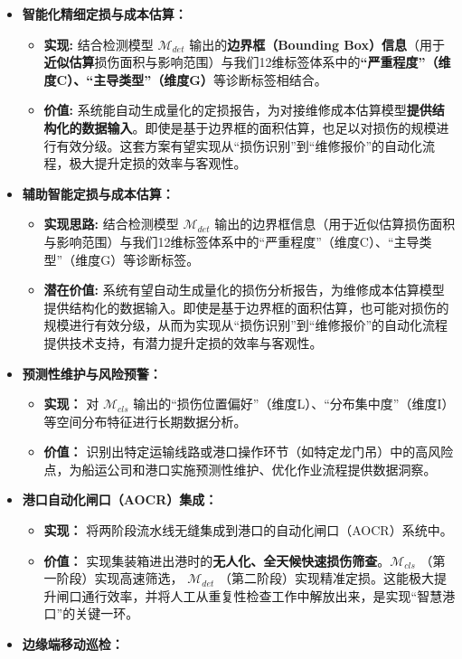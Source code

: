 \documentclass[
]{article}
\begin{document}
\begin{itemize}
\item
  \textbf{智能化精细定损与成本估算：}

  \begin{itemize}
  \item
    \textbf{实现:} 结合检测模型 \(\mathcal{M}_{det}\)
    输出的\textbf{边界框（Bounding
    Box）信息}（用于\textbf{近似估算}损伤面积与影响范围）与我们12维标签体系中的\textbf{``严重程度''（维度C）、``主导类型''（维度G）}等诊断标签相结合。
  \item
    \textbf{价值:}
    系统能自动生成量化的定损报告，为对接维修成本估算模型\textbf{提供结构化的数据输入}。即使是基于边界框的面积估算，也足以对损伤的规模进行有效分级。这套方案有望实现从``损伤识别''到``维修报价''的自动化流程，极大提升定损的效率与客观性。
  \end{itemize}
\item
  \textbf{辅助智能定损与成本估算：}

  \begin{itemize}
  \item
    \textbf{实现思路:} 结合检测模型 \(\mathcal{M}_{det}\)
    输出的边界框信息（用于近似估算损伤面积与影响范围）与我们12维标签体系中的``严重程度''（维度C）、``主导类型''（维度G）等诊断标签。
  \item
    \textbf{潜在价值:}
    系统有望自动生成量化的损伤分析报告，为维修成本估算模型提供结构化的数据输入。即使是基于边界框的面积估算，也可能对损伤的规模进行有效分级，从而为实现从``损伤识别''到``维修报价''的自动化流程提供技术支持，有潜力提升定损的效率与客观性。
  \end{itemize}
\item
  \textbf{预测性维护与风险预警：}

  \begin{itemize}
  \item
    \textbf{实现：} 对 \(\mathcal{M}_{cls}\)
    输出的``损伤位置偏好''（维度L）、``分布集中度''（维度I）等空间分布特征进行长期数据分析。
  \item
    \textbf{价值：}
    识别出特定运输线路或港口操作环节（如特定龙门吊）中的高风险点，为船运公司和港口实施预测性维护、优化作业流程提供数据洞察。
  \end{itemize}
\item
  \textbf{港口自动化闸口（AOCR）集成：}

  \begin{itemize}
  \item
    \textbf{实现：}
    将两阶段流水线无缝集成到港口的自动化闸口（AOCR）系统中。
  \item
    \textbf{价值：}
    实现集装箱进出港时的\textbf{无人化、全天候快速损伤筛查}。\(\mathcal{M}_{cls}\)
    （第一阶段）实现高速筛选， \(\mathcal{M}_{det}\)
    （第二阶段）实现精准定损。这能极大提升闸口通行效率，并将人工从重复性检查工作中解放出来，是实现``智慧港口''的关键一环。
  \end{itemize}
\item
  \textbf{边缘端移动巡检：}


\end{itemize}
\end{document}
